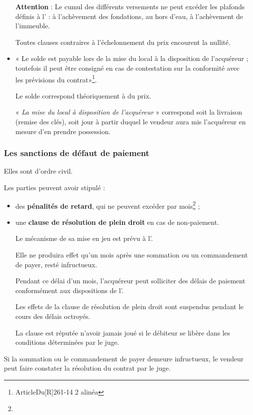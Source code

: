 \begin{itemize}
				\medbreak\textbf{Attention} : Le cumul des différents versements ne peut excéder les plafonds définis à l' :   à l'achèvement des fondations,  au hors d'eau,  à l'achèvement de l'immeuble.

				Toutes clauses contraires à l’échelonnement du prix encourent la nullité.


				\item « Le solde est payable lors de la mise du local à la disposition de l'acquéreur ; toutefois il peut être consigné en cas de contestation sur la conformité avec les prévisions du contrat»\footnote{ArticleDu[R]{261-14 2\ieme{} alinéa}{\cch}}.

				Le solde correspond théoriquement à  du prix.

				«\emph{ La mise du local à disposition de l'acquéreur} » correspond soit la livraison (remise des clés), soit jour à partir duquel le vendeur aura mis l’acquéreur en mesure d'en prendre possession.
			\end{itemize}


		\subsubsection{Les sanctions de défaut de paiement}

			Elles sont d’ordre civil.

			\medskip Les parties peuvent avoir stipulé :
			\begin{itemize}
				\item des \textbf{pénalités de retard},	qui ne peuvent excéder  par mois\footnote{} ;

				\item une \textbf{clause de résolution de plein droit} en cas de non-paiement.

					Le mécanisme de sa mise en jeu est prévu à l’.

					Elle ne produira effet qu’un mois après une sommation ou un commandement de payer, resté infructueux.

					Pendant ce délai d’un mois, l’acquéreur peut solliciter des délais de paiement conformément aux dispositions de l’.

					Les effets de la clause de résolution de plein droit sont suspendus pendant le cours des délais octroyés.

					La clause est réputée n'avoir jamais joué si le débiteur se libère dans les conditions déterminées par le juge.
			\end{itemize}

			Si la sommation ou le commandement de payer demeure infructueux, le vendeur peut faire constater la résolution du contrat par le juge.

